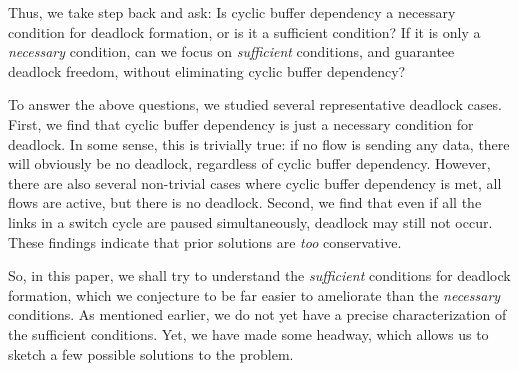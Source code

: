 Thus, we take step back and ask: Is cyclic buffer dependency a
necessary condition for deadlock formation, or is it a sufficient condition? If
it is only a {\em necessary} condition, can we focus on {\em sufficient}
conditions, and guarantee deadlock freedom, without  eliminating cyclic buffer
dependency?

To answer the above questions, we studied several representative deadlock cases.
First, we find that cyclic buffer dependency is
just a necessary condition for deadlock. In some sense, this is trivially true:
if no flow is sending any data, there will obviously be no deadlock, regardless
of cyclic buffer dependency.  However, there are also several non-trivial cases
where cyclic buffer dependency is met, all flows are active, but there is no
deadlock.  Second, we find that even if all the links in a switch cycle are
paused simultaneously, deadlock may still not occur.  These findings
indicate that prior solutions are {\em too} conservative.

So, in this paper, we shall try to understand the {\em sufficient} conditions
for deadlock formation, which we conjecture to be far easier to ameliorate than
the {\em necessary} conditions. As mentioned earlier, we do not yet have a
precise characterization of the sufficient conditions. Yet, we have made some
headway, which allows us to sketch a few possible solutions to the problem.

